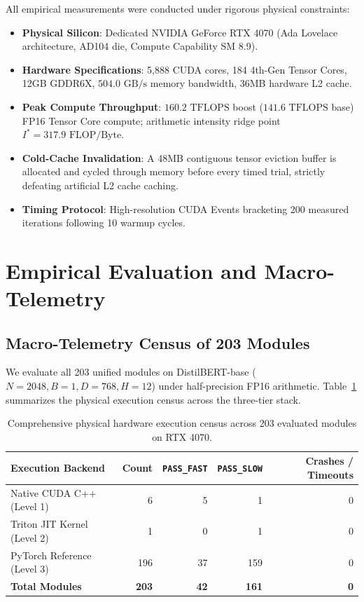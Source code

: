 \documentclass{article}
\newcommand{\passfast}{\texttt{PASS\_FAST}}
\newcommand{\passslow}{\texttt{PASS\_SLOW}}
\begin{document}
All empirical measurements were conducted under rigorous physical constraints:
\begin{itemize}
    \item \textbf{Physical Silicon}: Dedicated NVIDIA GeForce RTX 4070 (Ada Lovelace architecture, AD104 die, Compute Capability SM 8.9).
    \item \textbf{Hardware Specifications}: 5,888 CUDA cores, 184 4th-Gen Tensor Cores, 12GB GDDR6X, $504.0\text{ GB/s}$ memory bandwidth, 36MB hardware L2 cache.
    \item \textbf{Peak Compute Throughput}: $160.2\text{ TFLOPS}$ boost ($141.6\text{ TFLOPS}$ base) FP16 Tensor Core compute; arithmetic intensity ridge point $I^* = 317.9\text{ FLOP/Byte}$.
    \item \textbf{Cold-Cache Invalidation}: A 48MB contiguous tensor eviction buffer is allocated and cycled through memory before every timed trial, strictly defeating artificial L2 cache caching.
    \item \textbf{Timing Protocol}: High-resolution CUDA Events bracketing 200 measured iterations following 10 warmup cycles.
\end{itemize}

\section{Empirical Evaluation and Macro-Telemetry}
\label{sec:experiments}

\subsection{Macro-Telemetry Census of 203 Modules}
We evaluate all 203 unified modules on DistilBERT-base ($N=2048, B=1, D=768, H=12$) under half-precision FP16 arithmetic. Table~\ref{tab:iclr_dispatch} summarizes the physical execution census across the three-tier stack.

\begin{table}[ht]
\centering
\caption{Comprehensive physical hardware execution census across 203 evaluated modules on RTX 4070.}
\label{tab:iclr_dispatch}
\begin{tabular}{lrrrr}
\toprule
\textbf{Execution Backend} & \textbf{Count} & \textbf{\passfast{}} & \textbf{\passslow{}} & \textbf{Crashes / Timeouts} \\
\midrule
Native CUDA C++ (Level 1) & 6 & 5 & 1 & 0 \\
Triton JIT Kernel (Level 2) & 1 & 0 & 1 & 0 \\
PyTorch Reference (Level 3) & 196 & 37 & 159 & 0 \\
\midrule
\textbf{Total Modules} & \textbf{203} & \textbf{42} & \textbf{161} & \textbf{0} \\
\bottomrule
\end{tabular}
\end{table}
\end{document}
